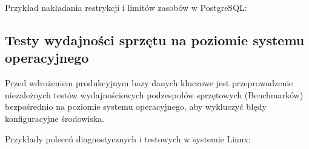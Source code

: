 \documentclass[a4paper,11pt,english,openany,oneside]{sphinxmanual}
\begin{document}
\sphinxAtStartPar
Przykład nakładania restrykcji i limitów zasobów w PostgreSQL:

\begin{sphinxVerbatim}[commandchars=\\\{\}]


\end{sphinxVerbatim}


\subsection{Testy wydajności sprzętu na poziomie systemu operacyjnego}
\label{\detokenize{rozdzial_2/rozdzial_25/index:testy-wydajnosci-sprzetu-na-poziomie-systemu-operacyjnego}}
\sphinxAtStartPar
Przed wdrożeniem produkcyjnym bazy danych kluczowe jest przeprowadzenie niezależnych testów wydajnościowych podzespołów sprzętowych (Benchmarków) bezpośrednio na poziomie systemu operacyjnego, aby wykluczyć błędy konfiguracyjne środowiska.

\sphinxAtStartPar
Przykłady poleceń diagnostycznych i testowych w systemie Linux:
\end{document}
